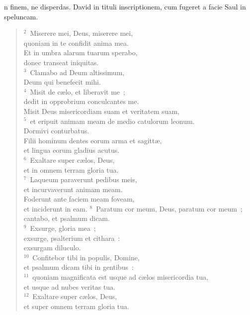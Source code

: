 \bchapter
{}n finem, ne disperdas. David in tituli inscriptionem, cum fugeret a facie Saul in speluncam.
\begin{flushleft}\begin{verse}\vspace{6pt}${}^{2}$~Miserere mei, Deus, miserere mei,\\ quoniam in te confidit anima mea.\\ Et in umbra alarum tuarum sperabo,\\ donec transeat iniquitas.\\
${}^{3}$~Clamabo ad Deum altissimum,\\ Deum qui benefecit mihi.\\
${}^{4}$~Misit de c\ae lo, et liberavit me~;\\ dedit in opprobrium conculcantes me.\\ Misit Deus misericordiam suam et veritatem suam,\\
${}^{5}$~et eripuit animam meam de medio catulorum leonum.\\ Dormivi conturbatus.\\ Filii hominum dentes eorum arma et sagitt\ae ,\\ et lingua eorum gladius acutus.\\
${}^{6}$~Exaltare super c\ae los, Deus,\\ et in omnem terram gloria tua.\\
${}^{7}$~Laqueum paraverunt pedibus meis,\\ et incurvaverunt animam meam.\\ Foderunt ante faciem meam foveam,\\ et inciderunt in eam.
${}^{8}$~Paratum cor meum, Deus, paratum cor meum~;\\ cantabo, et psalmum dicam.\\
${}^{9}$~Exsurge, gloria mea~;\\ exsurge, psalterium et cithara~:\\ exsurgam diluculo.\\
${}^{10}$~Confitebor tibi in populis, Domine,\\ et psalmum dicam tibi in gentibus~:\\
${}^{11}$~quoniam magnificata est usque ad c\ae los misericordia tua,\\ et usque ad nubes veritas tua.\\
${}^{12}$~Exaltare super c\ae los, Deus,\\ et super omnem terram gloria tua.\end{verse}\end{flushleft}



